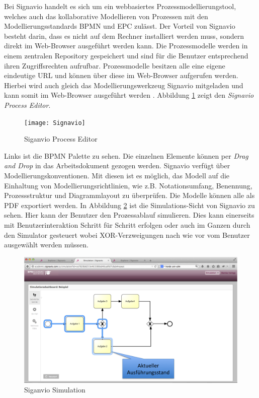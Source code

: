 Bei Signavio handelt es sich um ein webbasiertes Prozessmodellierungstool, welches auch das kollaborative Modellieren von Prozessen mit den Modellierungsstandards BPMN und EPC zulässt. Der Vorteil von Signavio besteht darin, dass es nicht auf dem Rechner installiert werden muss, sondern direkt im Web-Browser ausgeführt werden kann. Die Prozessmodelle werden in einem zentralen Repository gespeichert und sind für die Benutzer entsprechend ihren Zugriffsrechten aufrufbar. Prozessmodelle besitzen alle eine eigene eindeutige URL und können über diese im Web-Browser aufgerufen werden. Hierbei wird auch gleich das Modellierungswerkzeug Signavio mitgeladen und kann somit im Web-Browser ausgeführt werden \cite{quteprints}. \newline
Abbildung \ref{fig:Signavio} zeigt den \textit{Signavio Process Editor}.
\begin{figure}[H]
\begin{center}
  \texttt{[image: Signavio]} %
  \caption{Siganvio Process Editor}
  \label{fig:Signavio}
\end{center}
\end{figure} 
Links ist die BPMN Palette zu sehen. Die einzelnen Elemente können per \textit{Drag and Drop} in das Arbeitsdokument gezogen werden. Signavio verfügt über Modellierungskonventionen. Mit diesen ist es  möglich, das Modell auf die Einhaltung von Modellierungsrichtlinien, wie z.B. Notationsumfang, Benennung, Prozessstruktur und Diagrammlayout zu überprüfen. Die Modelle können alle als PDF exportiert werden. \newline
In Abbildung \ref{fig:Simulation} ist die Simulations-Sicht von Signavio zu sehen. Hier kann der Benutzer den Prozessablauf simulieren. Dies kann einerseits mit Benutzerinteraktion Schritt für Schritt erfolgen oder auch im Ganzen durch den Simulator gesteuert wobei XOR-Verzweigungen nach wie vor vom Benutzer ausgewählt werden müssen.
\begin{figure}[H]
\begin{center}
  \includegraphics[scale=0.6]{Simulation} %
  \caption{Siganvio Simulation}
  \label{fig:Simulation}
\end{center}
\end{figure} 



